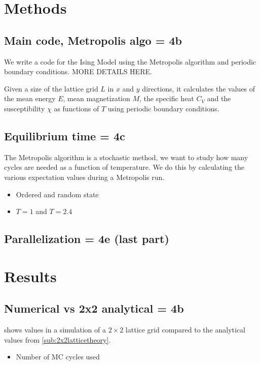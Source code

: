 \documentclass[10pt]{article}
\begin{document}
\begin{multicols}{2}
\section{Methods}
\subsection{Main code, Metropolis algo = 4b}
We write a code for the Ising Model using the Metropolis algorithm and
periodic boundary conditions. MORE DETAILS HERE.

Given a size of the lattice grid $L$ in $x$ and $y$ directions, it
calculates the values of the mean energy $E$, mean magnetization $M$, the
specific heat $C_V$ and the susceptibility $\chi$ as functions of $T$ using
periodic boundary conditions.

\subsection{Equilibrium time = 4c}
The Metropolis algorithm is a stochastic method, we want to study how many
cycles are needed as a function of temperature. We do this by calculating
the various expectation values during a Metropolis run. 

\begin{itemize}
    \item Ordered and random state
    \item $T = 1$ and $T = 2.4$
\end{itemize}


\subsection{Parallelization = 4e (last part)}

\section{Results}
\subsection{Numerical vs 2x2 analytical = 4b}
 shows values in a simulation of a $2\times2$ lattice grid compared to
the analytical values from \cref{sub:2x2latticetheory}.

\begin{itemize}
    \item Number of MC cycles used
\end{itemize}


\end{multicols}
\end{document}
